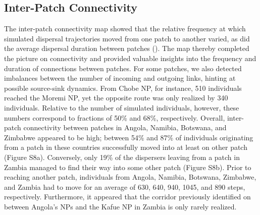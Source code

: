 \documentclass[abstract=on,10pt,a4paper,bibliography=totocnumbered]{article}
\begin{document}
\subsection{Inter-Patch Connectivity}
The inter-patch connectivity map showed that the relative frequency at which
simulated dispersal trajectories moved from one patch to another varied, as did
the average dispersal duration between patches ().
The map thereby completed the picture on connectivity and provided valuable
insights into the frequency and duration of connections between patches. For
some patches, we also detected imbalances between the number of incoming and
outgoing links, hinting at possible source-sink dynamics. From Chobe NP, for
instance, 510 individuals reached the Moremi NP, yet the opposite route was only
realized by 340 individuals. Relative to the number of simulated individuals,
however, these numbers correspond to fractions of 50\% and 68\%, respectively.
Overall, inter-patch connectivity between patches in Angola, Namibia, Botswana,
and Zimbabwe appeared to be high; between 54\% and 87\% of individuals
originating from a patch in these countries successfully moved into at least on
other patch (Figure S8a). Conversely, only 19\% of the dispersers leaving from a
patch in Zambia managed to find their way into some other patch (Figure S8b).
Prior to reaching another patch, individuals from Angola, Namibia, Botswana,
Zimbabwe, and Zambia had to move for an average of 630, 640, 940, 1045, and 890
steps, respectively. Furthermore, it appeared that the corridor previously
identified on  between Angola's NPs and the Kafue
NP in Zambia is only rarely realized.
\end{document}
